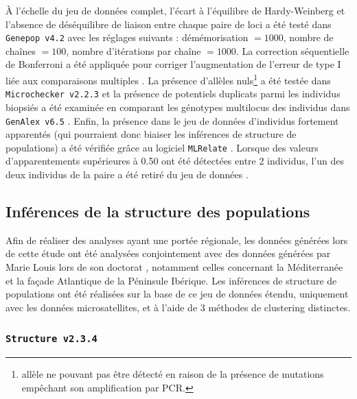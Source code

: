 \documentclass[a4paper,12pt,twoside]{article}\usepackage[]{graphicx}\usepackage[]{color}
\begin{document}
\begin {bibunit} [newbst]
À l'échelle du jeu de données complet, l'écart à l'équilibre de Hardy-Weinberg et l'absence de déséquilibre de liaison entre chaque paire de loci a été testé dans \texttt{Genepop~v4.2} \citep{rousset2008} avec les réglages suivants : démémorisation $= 1000$, nombre de chaînes $= 100$, nombre d'itérations par chaîne $= 1000$. La correction séquentielle de Bonferroni a été appliquée pour corriger l'augmentation de l'erreur de type I liée aux comparaisons multiples \citep{holm1979}.
La présence d'allèles nuls\footnote{allèle ne pouvant pas être détecté en raison de la présence de mutations empêchant son amplification par PCR.} a été testée dans \texttt{Microchecker~v2.2.3} \citep{oosterhoot2004} et la présence de potentiels duplicats parmi les individus biopsiés a été examinée en comparant les génotypes multilocus des individus dans \texttt{GenAlex~v6.5} \citep{peakall2012}. Enfin, la présence dans le jeu de données d'individus fortement apparentés (qui pourraient donc biaiser les inférences de structure de populations) a été vérifiée grâce au logiciel \texttt{MLRelate} \citep{kalinowski2006}. Lorsque des valeurs d'apparentements supérieures à 0.50 ont été détectées entre 2 individus, l'un des deux individus de la paire a été retiré du jeu de données \citep{viricel2014}.


\subsection{Inférences de la structure des populations}

Afin de réaliser des analyses ayant une portée régionale, les données générées lors de cette étude ont été analysées conjointement avec des données générées par Marie Louis lors de son doctorat \citep{phdLouis2014}, notamment celles concernant la Méditerranée et la façade Atlantique de la Péninsule Ibérique. Les inférences de structure de populations ont été réalisées sur la base de ce jeu de données étendu, uniquement avec les données microsatellites, et à l'aide de 3 méthodes de clustering distinctes.

\subsubsection*{\texttt{Structure~v2.3.4} \citep{pritchard2000}}


\end{bibunit}
\end{document}
